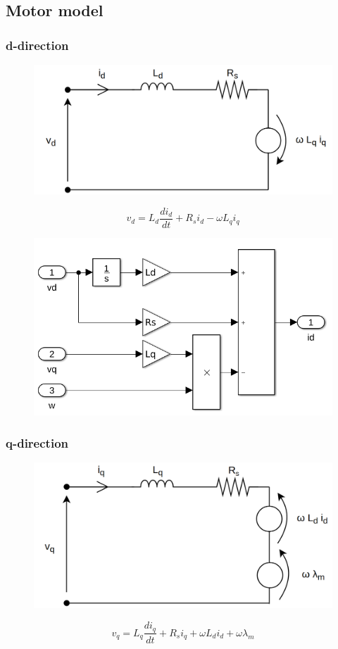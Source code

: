 \subsection{Motor model}


\subsubsection{d-direction}
\begin{figure}[H]
	\centering
	\includegraphics[width=0.6\linewidth]{pictures/control/vd}
	\caption{}
	\label{fig:vd}
\end{figure}


\begin{equation}\label{eq:d_direction}
v_d = L_d \frac{d i_d}{dt} + R_s i_d - \omega L_q i_q
\end{equation}


\begin{figure}[H]
	\centering
	\includegraphics[width=0.6\linewidth]{pictures/control/simulink_d_direction.png}
	\caption{}
	\label{fig:simulink_d_direction}
\end{figure}



\subsubsection{q-direction}
\begin{figure}[H]
	\centering
	\includegraphics[width=0.6\linewidth]{pictures/control/vq.png}
	\caption{}
	\label{fig:vq}
\end{figure}
\begin{equation}\label{eq:q_direction}
v_q = L_q\frac{d i_q}{dt} + R_s i_q + \omega L_d i_d + \omega \lambda_m
\end{equation}

